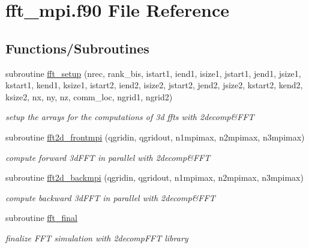 \hypertarget{fft__mpi_8f90}{\section{fft\-\_\-mpi.\-f90 File Reference}
\label{fft__mpi_8f90}
}
\subsection*{Functions/\-Subroutines}
\begin{DoxyCompactItemize}
\item 
subroutine \hyperlink{fft__mpi_8f90_a934fb02c61186fea25814faf4e8ff019}{fft\-\_\-setup} (nrec, rank\-\_\-bis, istart1, iend1, isize1, jstart1, jend1, jsize1, kstart1, kend1, ksize1, istart2, iend2, isize2, jstart2, jend2, jsize2, kstart2, kend2, ksize2, nx, ny, nz, comm\-\_\-loc, ngrid1, ngrid2)
\begin{DoxyCompactList}\small\item\em setup the arrays for the computations of 3d ffts with 2decomp\&F\-F\-T \end{DoxyCompactList}\item 
subroutine \hyperlink{fft__mpi_8f90_a9e24205ee630a80792dd5d179c5f8429}{fft2d\-\_\-frontmpi} (qgridin, qgridout, n1mpimax, n2mpimax, n3mpimax)
\begin{DoxyCompactList}\small\item\em compute forward 3d\-F\-F\-T in parallel with 2decomp\&F\-F\-T \end{DoxyCompactList}\item 
subroutine \hyperlink{fft__mpi_8f90_abdd07940aee4c823edb5b931186bed23}{fft2d\-\_\-backmpi} (qgridin, qgridout, n1mpimax, n2mpimax, n3mpimax)
\begin{DoxyCompactList}\small\item\em compute backward 3d\-F\-F\-T in parallel with 2decomp\&F\-F\-T \end{DoxyCompactList}\item 
subroutine \hyperlink{fft__mpi_8f90_a2e23970fc146e5a0a89083e8d0cf81be}{fft\-\_\-final}
\begin{DoxyCompactList}\small\item\em finalize F\-F\-T simulation with 2decomp\-F\-F\-T library \end{DoxyCompactList}\end{DoxyCompactItemize}


